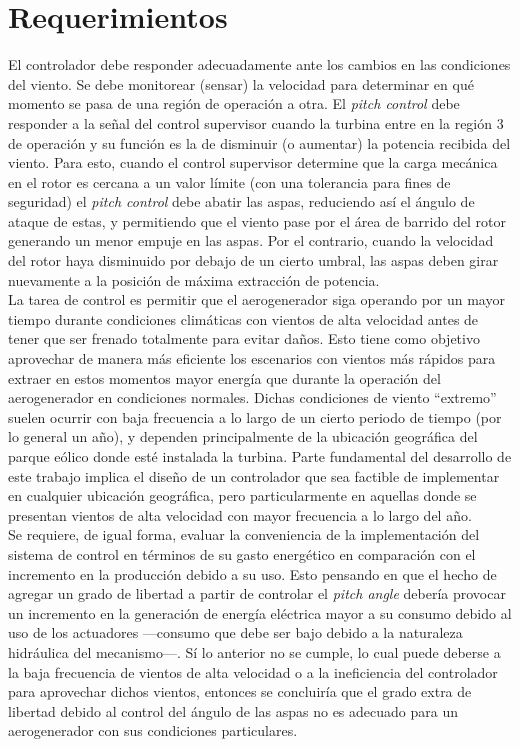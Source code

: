 \section{Requerimientos}
{\parindent0pt
El controlador debe responder adecuadamente ante los cambios en las condiciones del viento. Se debe monitorear (sensar) la velocidad para determinar en qué momento se pasa de una región de operación a otra. El \emph{pitch control} debe responder a la señal del control supervisor cuando la turbina entre en la región 3 de operación y su función es la de disminuir (o aumentar) la potencia recibida del viento. Para esto, cuando el control supervisor determine que la carga mecánica en el rotor es cercana a un valor límite (con una tolerancia para fines de seguridad) el \emph{pitch control} debe abatir las aspas, reduciendo así el ángulo de ataque de estas, y permitiendo que el viento pase por el área de barrido del rotor generando un menor empuje en las aspas. Por el contrario, cuando la velocidad del rotor haya disminuido por debajo de un cierto umbral, las aspas deben girar nuevamente a la posición de máxima extracción de potencia. 
\\

La tarea de control es permitir que el aerogenerador siga operando por un mayor tiempo durante condiciones climáticas con vientos de alta velocidad antes de tener que ser frenado totalmente para evitar daños. Esto tiene como objetivo aprovechar de manera más eficiente los escenarios con vientos más rápidos para extraer en estos momentos mayor energía que durante la operación del aerogenerador en condiciones normales. Dichas condiciones de viento “extremo” suelen ocurrir con baja frecuencia a lo largo de un cierto periodo de tiempo (por lo general un año), y dependen principalmente de la ubicación geográfica del parque eólico donde esté instalada la turbina. Parte fundamental del desarrollo de este trabajo implica el diseño de un controlador que sea factible de implementar en cualquier ubicación geográfica, pero particularmente en aquellas donde se presentan vientos de alta velocidad con mayor frecuencia a lo largo del año.
\\

Se requiere, de igual forma, evaluar la conveniencia de la implementación del sistema de control en términos de su gasto energético en comparación con el incremento en la producción debido a su uso. Esto pensando en que el hecho de agregar un grado de libertad a partir de controlar el \emph{pitch angle} debería provocar un incremento en la generación de energía eléctrica mayor a su consumo debido al uso de los actuadores —consumo que debe ser bajo debido a la naturaleza hidráulica del mecanismo—. Sí lo anterior no se cumple, lo cual puede deberse a la baja frecuencia de vientos de alta velocidad o a la ineficiencia del controlador para aprovechar dichos vientos, entonces se concluiría que el grado extra de libertad debido al control del ángulo de las aspas no es adecuado para un aerogenerador con sus condiciones particulares. 

}


